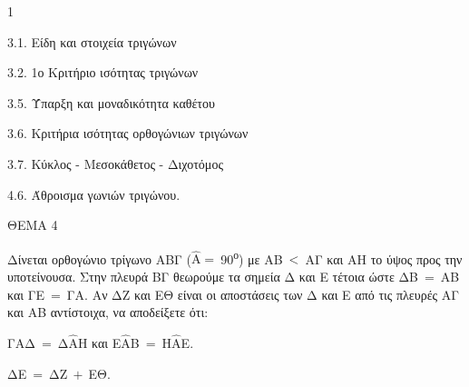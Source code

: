 \begin{ylh}{1}
    \item 3.1. Είδη και στοιχεία τριγώνων
    \item 3.2. 1ο Κριτήριο ισότητας τριγώνων
    \item 3.5. Ύπαρξη και μοναδικότητα καθέτου
    \item 3.6. Κριτήρια ισότητας ορθογώνιων τριγώνων
    \item 3.7. Κύκλος - Μεσοκάθετος - Διχοτόμος
    \item 4.6. Άθροισμα γωνιών τριγώνου.
\end{ylh}

ΘΕΜΑ 4

Δίνεται ορθογώνιο τρίγωνο ΑΒΓ ($\widehat{\text{Α}} = \ $90\textsuperscript{ο}) με ΑΒ$\  < \ $ΑΓ και ΑΗ το ύψος προς την υποτείνουσα. Στην πλευρά ΒΓ θεωρούμε τα σημεία Δ και Ε τέτοια ώστε ΔΒ$\  = \ $ΑΒ και ΓΕ$\  = \ $ΓΑ. Αν ΔΖ και ΕΘ είναι οι αποστάσεις των Δ και Ε από τις πλευρές ΑΓ και ΑΒ αντίστοιχα, να αποδείξετε ότι:

\begin{alist}
\item Γ$\widehat{\text{Α}}$Δ$\  = \ $Δ$\widehat{\text{Α}}$Η και Ε$\widehat{\text{Α}}$Β$\  = \ $Η$\widehat{\text{Α}}$Ε.


\item ΔΕ$\  = \ $ΔΖ$\  + \ $ΕΘ.

\end{alist}
